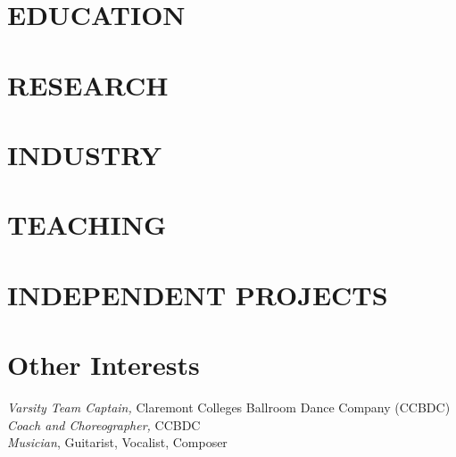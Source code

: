 \documentclass[margin, 10pt]{res} %
\begin{document}
\begin{resume}

\vspace{-1em}
\section{EDUCATION}


\vspace{-1.75em}
\section{RESEARCH}


\section{INDUSTRY}


\section{TEACHING}




\section{INDEPENDENT PROJECTS}


\section{Other Interests}

\textit{Varsity Team Captain,} Claremont Colleges Ballroom Dance Company (CCBDC)  \\
\textit{Coach and Choreographer,} CCBDC\\
\textit{Musician}, Guitarist, Vocalist, Composer

\end{resume}
\end{document}
